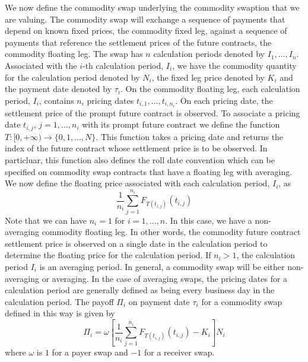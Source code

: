 We now define the commodity swap underlying the commodity swaption that we are valuing. The commodity swap will exchange a sequence of payments that depend on known fixed prices, the commodity fixed leg, against a sequence of payments that reference the settlement prices of the future contracts, the commodity floating leg. The swap has $n$ calculation periods denoted by $I_1, \ldots, I_n$. Associated with the $i$-th calculation period, $I_i$, we have the commodity quantity for the calculation period denoted by $N_i$, the fixed leg price denoted by $K_i$ and the payment date denoted by $\tau_i$. On the commodity floating leg, each calculation period, $I_i$, contains $n_i$ pricing dates $t_{i,1}, \ldots, t_{i, n_i}$. On each pricing date, the settlement price of the prompt future contract is observed. To associate a pricing date $t_{i,j}$, $j = 1, \ldots, n_i$ with its prompt future contract we define the function $T:[0, +\infty) \to \{ 0, 1, \ldots, N \}$. This function takes a pricing date and returns the index of the future contract whose settlement price is to be observed. In particluar, this function also defines the roll date convention which can be specified on commodity swap contracts that have a floating leg with averaging. We now define the floating price associated with each calculation period, $I_i$, as
\begin{equation}
\frac{1}{n_i} \sum_{j=1}^{n_i} F_{T(t_{i,j})}(t_{i,j})
\end{equation}
Note that we can have $n_i = 1$ for $i = 1, \ldots, n$. In this case, we have a non-averaging commodity floating leg. In other words, the commodity future contract settlement price is observed on a single date in the calculation period to determine the floating price for the calculation period. If $n_i > 1$, the calculation period $I_i$ is an averaging period. In general, a commodity swap will be either non-averaging or averaging. In the case of averaging swaps, the pricing dates for a calculation period are generally defined as being every business day in the calculation period. The payoff $\Pi_i$ on payment date $\tau_i$ for a commodity swap defined in this way is given by
\begin{equation}
\Pi_i = \omega \left[ \frac{1}{n_i} \sum_{j=1}^{n_i} F_{T(t_{i,j})}(t_{i,j}) - K_i \right] N_i
\end{equation}
where $\omega$ is $1$ for a payer swap and $-1$ for a receiver swap.

